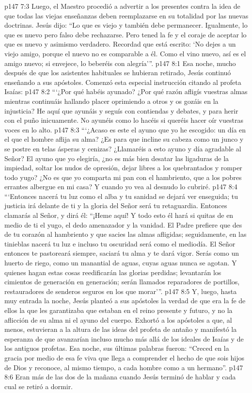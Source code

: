 \vs p147 7:3 Luego, el Maestro procedió a advertir a los presentes contra la idea de que todas las viejas enseñanzas deben reemplazarse en su totalidad por las nuevas doctrinas. Jesús dijo: “Lo que es viejo y también  debe permanecer. Igualmente, lo que es nuevo pero falso debe rechazarse. Pero tened la fe y el coraje de aceptar lo que es nuevo y asimismo verdadero. Recordad que está escrito: ‘No dejes a un viejo amigo, porque el nuevo no es comparable a él. Como el vino nuevo, así es el amigo nuevo; si envejece, lo beberéis con alegría’”.
\vs p147 8:1 Esa noche, mucho después de que los asistentes habituales se hubieran retirado, Jesús continuó enseñando a sus apóstoles. Comenzó esta especial instrucción citando al profeta Isaías:
\vs p147 8:2 \pc “‘¿Por qué habéis ayunado? ¿Por qué razón afligís vuestras almas mientras continuáis hallando placer oprimiendo a otros y os gozáis en la injusticia? He aquí que ayunáis y seguís con contiendas y debates, y para herir con el puño inicuamente. No ayunéis como lo hacéis si queréis hacer oír vuestras voces en lo alto.
\vs p147 8:3 “‘¿Acaso es este el ayuno que yo he escogido: un día en el que el hombre aflija su alma? ¿Es para que incline su cabeza como un junco y se postre en telas ásperas y cenizas? ¿Llamaréis a esto ayuno y día agradable al Señor? El ayuno que yo elegiría, ¿no es más bien desatar las ligaduras de la impiedad, soltar los nudos de opresión, dejar libres a los quebrantados y romper todo yugo? ¿No es que yo comparta mi pan con el hambriento, que a los pobres errantes albergue en mi casa? Y cuando yo vea al desnudo lo cubriré.
\vs p147 8:4 “‘Entonces nacerá tu luz como el alba y tu sanidad se dejará ver enseguida; tu justicia irá delante de ti y la gloria del Señor será tu retaguardia. Entonces clamarás al Señor, y dirá él: “¡Heme aquí! Y todo esto él hará si quitas de en medio de ti el yugo, el dedo amenazador y la vanidad. El Padre prefiere que des de tu corazón al hambriento y que sacies las almas afligidas; seguidamente, en las tinieblas nacerá tu luz e incluso tu oscuridad será como el mediodía. El Señor entonces te pastoreará siempre, saciará tu alma y te dará vigor. Serás como un huerto de riego, como un manantial de aguas, cuyas aguas nunca se agotan. Y quienes hagan estas cosas reedificarán las glorias perdidas; levantarán los cimientos de generación en generación; serán llamados reparadores de portillos, restauradores de senderos seguros en los que morar’”.
\vs p147 8:5 \pc Y, luego, hasta muy entrada la noche, Jesús planteó a sus apóstoles la verdad de que era la fe de ellos la que les garantizaba que estaban en el reino presente y futuro, y no la aflicción de su alma ni el ayuno del cuerpo. Exhortó a los apóstoles a que, al menos, estuvieran a la altura de las ideas del profeta de antaño y manifestó la esperanza de que avanzarían incluso mucho más allá de los ideales de Isaías y de los antiguos profetas. Esa noche, sus últimas palabras fueron: “Creced en la gracia por medio de esa fe viva que llega a comprender el hecho de que sois hijos de Dios y reconoce, al mismo tiempo, a cada hombre como a un hermano”.
\vs p147 8:6 Eran más de las dos de la mañana cuando Jesús terminó de hablar y cada cual se retiró a dormir.
